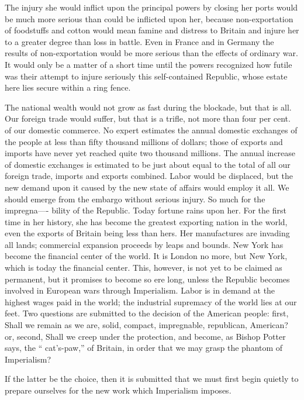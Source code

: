 \documentclass[11pt,openany]{book}
\begin{document}
The injury she would inflict upon the principal powers by closing her ports would be much more serious than could be inflicted upon her, because non-exportation of foodstuffs and cotton would mean famine and distress to Britain and injure her to a greater degree than loss in battle. Even in France and in Germany the results of non-exportation would be more serious than the effects of ordinary war. It would only be a matter of a short time until the powers recognized how futile was their attempt to injure seriously this self-contained Republic, whose estate here lies secure within a ring fence.

The national wealth would not grow as fast during the blockade, but that is all. Our foreign trade would suffer, but that is a trifle, not more than four per cent. of our domestic commerce. No expert estimates the annual domestic exchanges of the people at less than fifty thousand millions of dollars; those of exports and imports have never yet reached quite two thousand millions. The annual increase of domestic exchanges is estimated to be just about equal to the total of all our foreign trade, imports and exports combined. Labor would be displaced, but the new demand upon it caused by the new state of affairs would employ it all. We should emerge from the embargo without serious injury. So much for the impregna---- bility of the Republic. Today fortune rains upon her. For the first time in her history, she has become the greatest exporting nation in the world, even the exports of Britain being less than hers. Her manufactures are invading all lands; commercial expansion proceeds by leaps and bounds. New York has become the financial center of the world. It is London no more, but New York, which is today the financial center. This, however, is not yet to be claimed as permanent, but it promises to become so ere long, unless the Republic becomes involved in European wars through Imperialism. Labor is in demand at the highest wages paid in the world; the industrial supremacy of the world lies at our feet. Two questions are submitted to the decision of the American people: first, Shall we remain as we are, solid, compact, impregnable, republican, American? or, second, Shall we creep under the protection, and become, as Bishop Potter says, the `` cat's-paw,'' of Britain, in order that we may grasp the phantom of Imperialism?

If the latter be the choice, then it is submitted that we must first begin quietly to prepare ourselves for the new work which Imperialism imposes.
\end{document}
